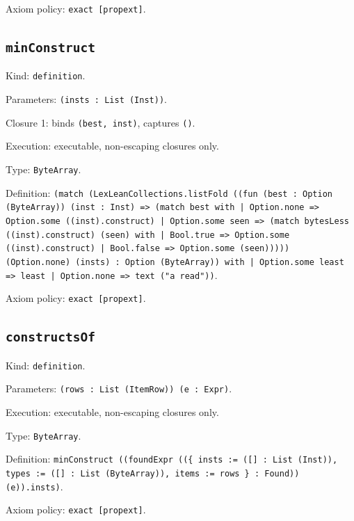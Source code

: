 \documentclass[11pt]{article}
\begin{document}
\noindent Axiom policy: \texttt{exact [propext]}.\par
\subsection*{\texttt{minConstruct}}
\noindent Kind: \texttt{definition}.\par
\noindent Parameters: \texttt{(insts : List (Inst))}.\par
\noindent Closure 1: binds \texttt{(best, inst)}, captures \texttt{()}.\par
\noindent Execution: executable, non-escaping closures only.\par
\noindent Type: \texttt{ByteArray}.\par
\noindent Definition: \texttt{(match (LexLeanCollections.listFold ((fun (best : Option (ByteArray)) (inst : Inst) => (match best with | Option.none => Option.some ((inst).construct) | Option.some seen => (match bytesLess ((inst).construct) (seen) with | Bool.true => Option.some ((inst).construct) | Bool.false => Option.some (seen))))) (Option.none) (insts) : Option (ByteArray)) with | Option.some least => least | Option.none => text ("a read"))}.\par
\noindent Axiom policy: \texttt{exact [propext]}.\par
\subsection*{\texttt{constructsOf}}
\noindent Kind: \texttt{definition}.\par
\noindent Parameters: \texttt{(rows : List (ItemRow)) (e : Expr)}.\par
\noindent Execution: executable, non-escaping closures only.\par
\noindent Type: \texttt{ByteArray}.\par
\noindent Definition: \texttt{minConstruct ((foundExpr ((\{ insts := ([] : List (Inst)), types := ([] : List (ByteArray)), items := rows \} : Found)) (e)).insts)}.\par
\noindent Axiom policy: \texttt{exact [propext]}.\par
\end{document}

